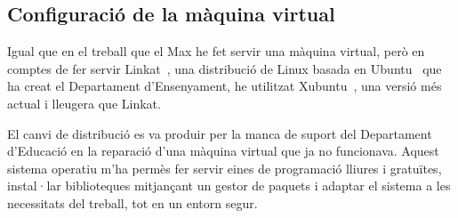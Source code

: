 \subsection{Configuració de la màquina virtual}
Igual que en el treball que el Max he fet servir una màquina virtual, però en comptes de fer servir Linkat~\cite{Linkat}, una distribució de Linux basada en Ubuntu~\cite{Ubuntu} que ha creat el Departament d'Ensenyament, he utilitzat Xubuntu~\cite{XUbuntu}, una versió més actual i lleugera que Linkat.

El canvi de distribució es va produir per la manca de suport del Departament d'Educació en la reparació d'una màquina virtual que ja no funcionava.
Aquest sistema operatiu m'ha permès fer servir eines de programació lliures i gratuïtes, instal·lar biblioteques mitjançant un gestor de paquets i adaptar el sistema a les necessitats del treball, tot en un entorn segur.

%


